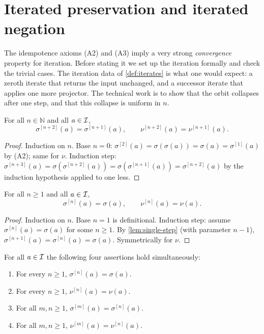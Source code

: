 \section{Iterated preservation and iterated negation}\label{sec:aufheb-iter}

The idempotence axioms (A2) and (A3) imply a very strong
\emph{convergence} property for iteration. Before stating it we set
up the iteration formally and check the trivial cases. The
iteration data of \cref{def:iterates} is what one would expect: a
zeroth iterate that returns the input unchanged, and a successor
iterate that applies one more projector. The technical work is to
show that the orbit collapses after one step, and that this
collapse is uniform in $n$.

\begin{lemma}\label{lem:single-step}
For all $n\in\mathbb{N}$ and all $a\in\mathcal{I}$,
\[
\sigma^{[n+2]}(a)=\sigma^{[n+1]}(a),\qquad
\nu^{[n+2]}(a)=\nu^{[n+1]}(a).
\]
\end{lemma}

\begin{proof}
Induction on $n$. Base $n=0$: $\sigma^{[2]}(a)=\sigma(\sigma(a))=
\sigma(a)=\sigma^{[1]}(a)$ by (A2); same for $\nu$. Induction step:
$\sigma^{[n+3]}(a)=\sigma(\sigma^{[n+2]}(a))=\sigma(\sigma^{[n+1]}(a))
=\sigma^{[n+2]}(a)$ by the induction hypothesis applied to one less.
\end{proof}

\begin{theorem}\label{thm:closed-form}
For all $n\geq 1$ and all $a\in\mathcal{I}$,
\[
\sigma^{[n]}(a)=\sigma(a),\qquad \nu^{[n]}(a)=\nu(a).
\]
\end{theorem}

\begin{proof}
Induction on $n$. Base $n=1$ is definitional. Induction step: assume
$\sigma^{[n]}(a)=\sigma(a)$ for some $n\geq 1$. By
\cref{lem:single-step} (with parameter $n-1$),
$\sigma^{[n+1]}(a)=\sigma^{[n]}(a)=\sigma(a)$. Symmetrically for
$\nu$.
\end{proof}

\begin{theorem}\label{thm:3-2}
For all $a\in\mathcal{I}$ the following four assertions hold
simultaneously:
\begin{enumerate}
\item For every $n\geq 1$, $\sigma^{[n]}(a)=\sigma(a)$.
\item For every $n\geq 1$, $\nu^{[n]}(a)=\nu(a)$.
\item For all $m,n\geq 1$, $\sigma^{[m]}(a)=\sigma^{[n]}(a)$.
\item For all $m,n\geq 1$, $\nu^{[m]}(a)=\nu^{[n]}(a)$.
\end{enumerate}
\end{theorem}

